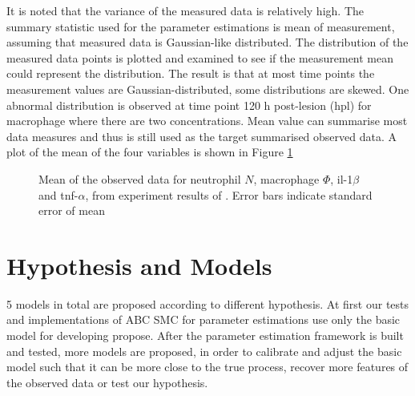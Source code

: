 \documentclass[12pt,a4paper]{report}
\begin{document}
It is noted that the variance of the measured data is relatively high. The summary statistic used for the parameter estimations is mean of measurement, assuming that measured data is Gaussian-like distributed. The distribution of the measured data points is plotted and examined to see if the measurement mean could represent the distribution. The result is that at most time points the measurement values are Gaussian-distributed, some distributions are skewed. One abnormal distribution is observed at time point 120 h post-lesion (hpl) for macrophage where there are two concentrations. Mean value can summarise most data measures and thus is still used as the target summarised observed data. A plot of the mean of the four variables is shown in Figure \ref{fig:obs_data}

\begin{figure}
\begin{center}
\end{center}

\caption{Mean of the observed data for neutrophil $N$, macrophage $\Phi$, il-1$\beta$ and tnf-$\alpha$, from experiment results of \cite{ref:Tsarouchas}. Error bars indicate standard error of mean} 
\label{fig:obs_data}

\end{figure}

\section{Hypothesis and Models}

5 models in total are proposed according to different hypothesis. At first our tests and implementations of ABC SMC for parameter estimations use only the basic model for developing propose. After the parameter estimation framework is built and tested, more models are proposed, in order to calibrate and adjust the basic model such that it can be more close to the true process, recover more features of the observed data or test our hypothesis. 
\end{document}
